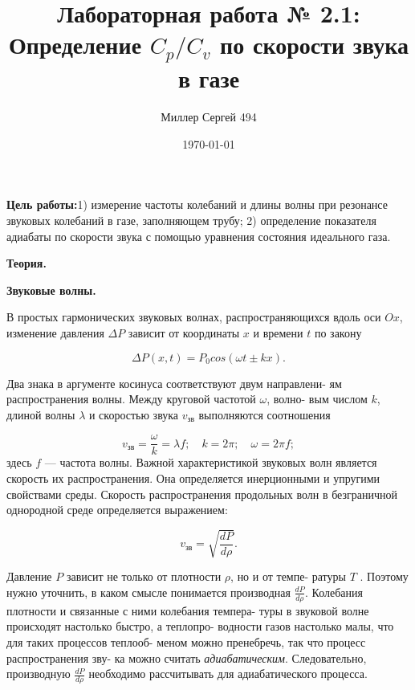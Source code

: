 \documentclass[12pt]{article}
\title{Лабораторная работа № 2.1:
    Определение $C_p/C_v$ по скорости звука в газе    
}
\date{\today}
\author{Миллер Сергей 494}
\begin{document}
    \maketitle
    \textbf{Цель работы:}1)  измерение частоты колебаний и длины волны при резонансе звуковых колебаний в газе, заполняющем трубу; 2) определение показателя адиабаты по скорости звука с помощью уравнения состояния идеального газа.

    \textbf{Теория.}

    \textbf{Звуковые волны.} 

    В простых гармонических звуковых волнах, распространяющихся вдоль оси $Ox$, изменение давления $\Delta P$ зависит от координаты $x$ и времени $t$ по закону

    \begin{equation}
        \Delta P(x,t) = P_0 cos(\omega t \pm kx).
    \end{equation}

    Два знака в аргументе косинуса соответствуют двум направлени- ям распространения волны. Между круговой частотой $\omega$, волно- вым числом $k$, длиной волны $\lambda$ и скоростью звука $v_\text{зв}$ выполняются соотношения

    \begin{equation}
        v_\text{зв} = \frac{\omega}{k} = \lambda f; \quad k = 2\pi; \quad \omega = 2\pi f;
    \end{equation}
    здесь $f$ — частота волны.
    Важной характеристикой звуковых волн является скорость их
    распространения. Она определяется инерционными и упругими свойствами среды. Скорость распространения продольных волн в безграничной однородной среде определяется выражением:
     
    \begin{equation}
        v_\text{зв} = \sqrt{\frac{dP}{d\rho}}.
    \end{equation}

    Давление $P$ зависит не только от плотности $\rho$, но и от темпе- ратуры $T$ . Поэтому нужно уточнить, в каком смысле понимается производная $\frac{dP}{d\rho}$.
    Колебания плотности и связанные с ними колебания темпера- туры в звуковой волне происходят настолько быстро, а теплопро- водности газов настолько малы, что для таких процессов теплооб- меном можно пренебречь, так что процесс распространения зву- ка можно считать \textit{адиабатическим}. Следовательно, производную $\frac{dP}{d\rho}$ необходимо рассчитывать для адиабатического процесса.
\end{document}
